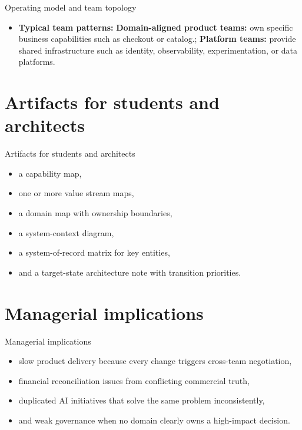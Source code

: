 \documentclass[aspectratio=169]{beamer}
\begin{document}
\begin{frame}{Operating model and team topology}
  \begin{itemize}
    \item \textbf{Typical team patterns:} \textbf{Domain-aligned product teams:} own specific business capabilities such as checkout or catalog.; \textbf{Platform teams:} provide shared infrastructure such as identity, observability, experimentation, or data platforms.
  \end{itemize}
\end{frame}

\section{Artifacts for students and architects}

\begin{frame}{Artifacts for students and architects}
  \begin{itemize}
    \item a capability map,
    \item one or more value stream maps,
    \item a domain map with ownership boundaries,
    \item a system-context diagram,
    \item a system-of-record matrix for key entities,
    \item and a target-state architecture note with transition priorities.
  \end{itemize}
\end{frame}

\section{Managerial implications}

\begin{frame}{Managerial implications}
  \begin{itemize}
    \item slow product delivery because every change triggers cross-team negotiation,
    \item financial reconciliation issues from conflicting commercial truth,
    \item duplicated AI initiatives that solve the same problem inconsistently,
    \item and weak governance when no domain clearly owns a high-impact decision.
  \end{itemize}
\end{frame}
\end{document}
